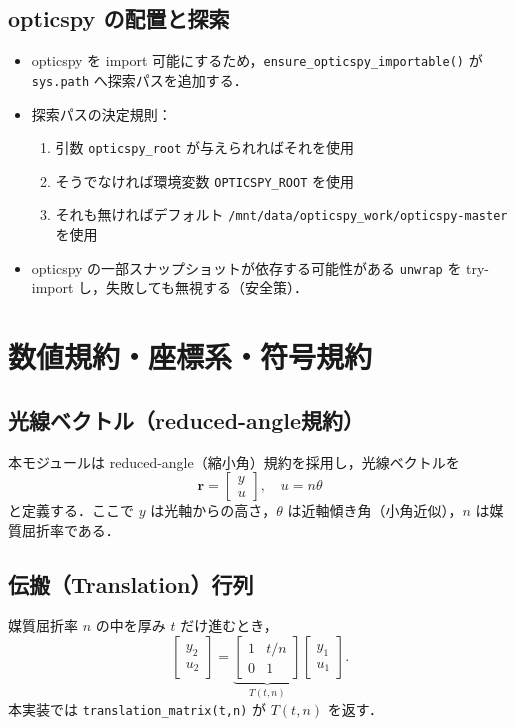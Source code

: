 \documentclass[a4paper,11pt]{jsarticle} %
\begin{document}
\subsection{opticspy の配置と探索}
\begin{itemize}
  \item opticspy を import 可能にするため，\texttt{ensure\_opticspy\_importable()} が \texttt{sys.path} へ探索パスを追加する．
  \item 探索パスの決定規則：
    \begin{enumerate}
      \item 引数 \texttt{opticspy\_root} が与えられればそれを使用
      \item そうでなければ環境変数 \texttt{OPTICSPY\_ROOT} を使用
      \item それも無ければデフォルト \texttt{/mnt/data/opticspy\_work/opticspy-master} を使用
    \end{enumerate}
  \item opticspy の一部スナップショットが依存する可能性がある \texttt{unwrap} を try-import し，失敗しても無視する（安全策）．
\end{itemize}

\section{数値規約・座標系・符号規約}
\subsection{光線ベクトル（reduced-angle規約）}
本モジュールは reduced-angle（縮小角）規約を採用し，光線ベクトルを
\[
\mathbf{r}=\begin{bmatrix}y\\u\end{bmatrix},\quad u=n\theta
\]
と定義する．ここで $y$ は光軸からの高さ，$\theta$ は近軸傾き角（小角近似），$n$ は媒質屈折率である．

\subsection{伝搬（Translation）行列}
媒質屈折率 $n$ の中を厚み $t$ だけ進むとき，
\[
\begin{bmatrix}y_2\\u_2\end{bmatrix}=
\underbrace{\begin{bmatrix}1 & t/n\\0&1\end{bmatrix}}_{T(t,n)}
\begin{bmatrix}y_1\\u_1\end{bmatrix}.
\]
本実装では \texttt{translation\_matrix(t,n)} が $T(t,n)$ を返す．
\end{document}

